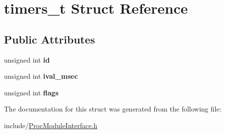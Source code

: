\hypertarget{structtimers__t}{}\section{timers\+\_\+t Struct Reference}
\label{structtimers__t}
\subsection*{Public Attributes}
\begin{DoxyCompactItemize}
\item 
\mbox{\label{structtimers__t_a4053595422c26f2b94dc8afbe0940fca}} 
unsigned int {\bfseries id}
\item 
\mbox{\label{structtimers__t_aa35f59725702a0a59fa6beac1d26ac10}} 
unsigned int {\bfseries ival\+\_\+msec}
\item 
\mbox{\label{structtimers__t_a0c1b2fbe810aed0b9ab7dbf62ae74d3c}} 
unsigned int {\bfseries flags}
\end{DoxyCompactItemize}


The documentation for this struct was generated from the following file\+:\begin{DoxyCompactItemize}
\item 
include/\hyperlink{ProcModuleInterface_8h}{Proc\+Module\+Interface.\+h}\end{DoxyCompactItemize}
